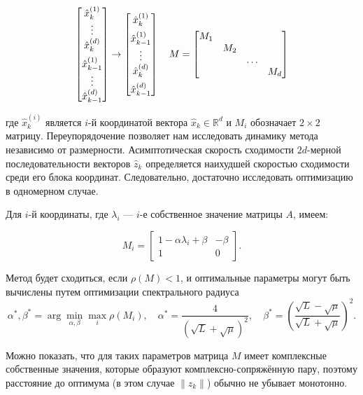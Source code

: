 \documentclass[
  russian,
  letterpaper,
  DIV=11,
  numbers=noendperiod]{scrartcl}
\begin{document}
\[
\begin{aligned}
\begin{bmatrix} 
\hat{x}_{k}^{(1)} \\
\vdots \\
\hat{x}_{k}^{(d)} \\
\addlinespace 
\hat{x}_{k-1}^{(1)} \\
\vdots \\
\hat{x}_{k-1}^{(d)}
\end{bmatrix} \to 
\begin{bmatrix} 
\hat{x}_{k}^{(1)} \\
\addlinespace 
\hat{x}_{k-1}^{(1)} \\
\vdots \\
\hat{x}_{k}^{(d)} \\
\addlinespace 
\hat{x}_{k-1}^{(d)}
\end{bmatrix} \quad M = \begin{bmatrix}
M_1\\
&M_2\\
&&\ldots\\
&&&M_d
\end{bmatrix}
\end{aligned}
\]

где \(\hat{x}_{k}^{(i)}\) является \(i\)-й координатой вектора
\(\hat{x}_{k} \in \mathbb{R}^d\) и \(M_i\) обозначает \(2 \times 2\)
матрицу. Переупорядочение позволяет нам исследовать динамику метода
независимо от размерности. Асимптотическая скорость сходимости
\(2d\)-мерной последовательности векторов \(\hat{z}_k\) определяется
наихудшей скоростью сходимости среди его блока координат. Следовательно,
достаточно исследовать оптимизацию в одномерном случае.

Для \(i\)-й координаты, где \(\lambda_i\) --- \(i\)-е собственное
значение матрицы \(A\), имеем:

\[
M_i = \begin{bmatrix} 
1 - \alpha \lambda_i + \beta & -\beta \\
1 & 0
\end{bmatrix}.
\]

Метод будет сходиться, если \(\rho(M) < 1\), и оптимальные параметры
могут быть вычислены путем оптимизации спектрального радиуса \[
\alpha^*, \beta^* = \arg \min_{\alpha, \beta} \max_{i} \rho(M_i), \quad \alpha^* = \dfrac{4}{(\sqrt{L} + \sqrt{\mu})^2}, \quad \beta^* = \left(\dfrac{\sqrt{L} - \sqrt{\mu}}{\sqrt{L} + \sqrt{\mu}}\right)^2.
\]

Можно показать, что для таких параметров матрица \(M\) имеет комплексные
собственные значения, которые образуют комплексно-сопряжённую пару,
поэтому расстояние до оптимума (в этом случае \(\| z_k \|\)) обычно не
убывает монотонно.
\end{document}

